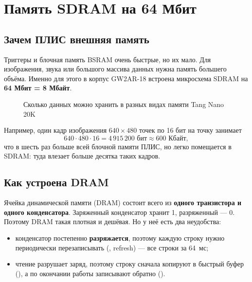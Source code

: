 \chapter{Память SDRAM на 64 Мбит}
\label{ch:sdram}

\section{Зачем ПЛИС внешняя память}

Триггеры и блочная память BSRAM очень быстрые, но их мало. Для
изображения, звука или большого массива данных нужна память большего объёма.
Именно для этого в корпус GW2AR-18 встроена микросхема SDRAM на
\textbf{64 Мбит = 8 Мбайт}.

\begin{figure}[H]
\centering
{}
\caption{Сколько данных можно хранить в разных видах памяти Tang Nano 20K}
\end{figure}

Например, один кадр изображения $640\times480$ точек по 16 бит на точку
занимает
\[
  640 \cdot 480 \cdot 16 = 4\,915\,200 \text{ бит} \approx 600 \text{ Кбайт},
\]
что в шесть раз больше всей блочной памяти ПЛИС, но легко помещается в
SDRAM: туда влезает больше десятка таких кадров.

\section{Как устроена DRAM}

Ячейка динамической памяти (DRAM) состоит всего из \textbf{одного
транзистора и одного конденсатора}. Заряженный конденсатор хранит 1,
разряженный --- 0. Поэтому DRAM такая плотная и дешёвая. Но у неё есть два
неудобства:
\begin{itemize}
  \item конденсатор постепенно \textbf{разряжается}, поэтому каждую строку
        нужно периодически перезаписывать (, refresh) --- все
        строки за 64~мс;
  \item чтение разрушает заряд, поэтому строку сначала копируют в
        быстрый буфер (), а по окончании работы записывают
        обратно ().
\end{itemize}

